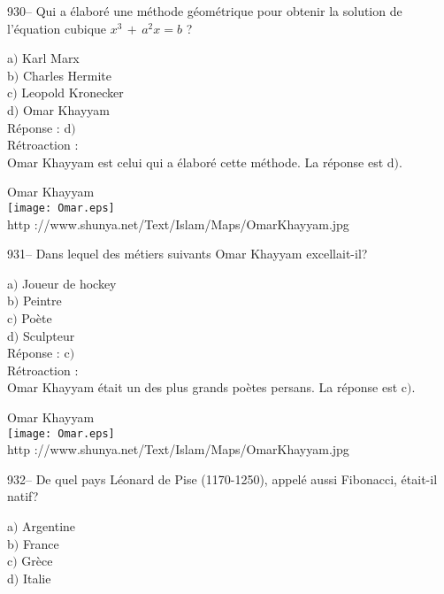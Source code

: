 ﻿\documentclass[letterpaper, 12pt]{article}
\begin{document}
930-- Qui a \'elabor\'e une m\'ethode g\'eom\'etrique pour obtenir
la solution de l'\'equation cubique $x^3\,+\,a^2x=b$ ?

a$)$ Karl Marx \\
b$)$ Charles Hermite \\
c$)$ Leopold Kronecker \\
d$)$ Omar Khayyam \\

R\'eponse : d$)$\\

R\'etroaction :\\
Omar Khayyam est celui qui a \'elabor\'e cette m\'ethode. La r\'eponse est
d$)$.\\

        \begin{center}
        Omar Khayyam\\
    \texttt{[image: Omar.eps]}\\
        {\footnotesize http
://www.shunya.net/Text/Islam/Maps/OmarKhayyam.jpg}
    \end{center}

931-- Dans lequel des m\'etiers suivants Omar Khayyam excellait-il?

a$)$ Joueur de hockey \\
b$)$ Peintre \\
c$)$ Po\`ete \\
d$)$ Sculpteur \\

R\'eponse : c$)$\\

R\'etroaction : \\
Omar Khayyam \'etait un des plus grands po\`etes persans. La r\'eponse est
c$)$.\\

        \begin{center}
        Omar Khayyam\\
    \texttt{[image: Omar.eps]}\\
        {\footnotesize http
://www.shunya.net/Text/Islam/Maps/OmarKhayyam.jpg}
    \end{center}

932-- De quel pays L\'eonard de Pise (1170-1250), appel\'e aussi
Fibonacci, \'etait-il natif?

a$)$ Argentine \\
b$)$ France  \\
c$)$ Gr\`ece  \\
d$)$ Italie \\
\end{document}
